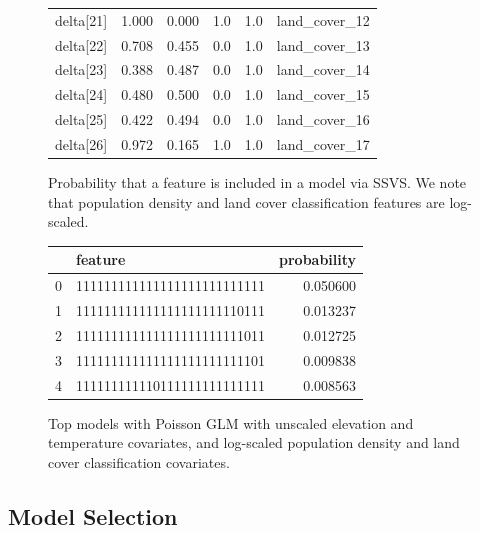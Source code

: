 \documentclass[notitlepage]{article}
\begin{document}
\begin{figure}[hbt!]
\begin{tabular}{lrrrrl}
delta[21] &  1.000 &  0.000 &     1.0 &      1.0 &       land\_cover\_12 \\
delta[22] &  0.708 &  0.455 &     0.0 &      1.0 &       land\_cover\_13 \\
delta[23] &  0.388 &  0.487 &     0.0 &      1.0 &       land\_cover\_14 \\
delta[24] &  0.480 &  0.500 &     0.0 &      1.0 &       land\_cover\_15 \\
delta[25] &  0.422 &  0.494 &     0.0 &      1.0 &       land\_cover\_16 \\
delta[26] &  0.972 &  0.165 &     1.0 &      1.0 &       land\_cover\_17 \\
\bottomrule
\end{tabular}
\caption{Probability that a feature is included in a model via SSVS. We note that population density and land cover classification features are log-scaled.}
\end{figure}

\begin{figure}[hbt!]
\centering
\begin{tabular}{llr}
\toprule
{} &                      feature &  probability \\
\midrule
0 &  111111111111111111111111111 &     0.050600 \\
1 &  111111111111111111111110111 &     0.013237 \\
2 &  111111111111111111111111011 &     0.012725 \\
3 &  111111111111111111111111101 &     0.009838 \\
4 &  111111111110111111111111111 &     0.008563 \\
\bottomrule
\end{tabular}
\caption{Top models with Poisson GLM with unscaled elevation and temperature covariates, and log-scaled population density and land cover classification covariates.}
\end{figure}

\subsection{Model Selection}
\label{model_selection}
\end{document}
